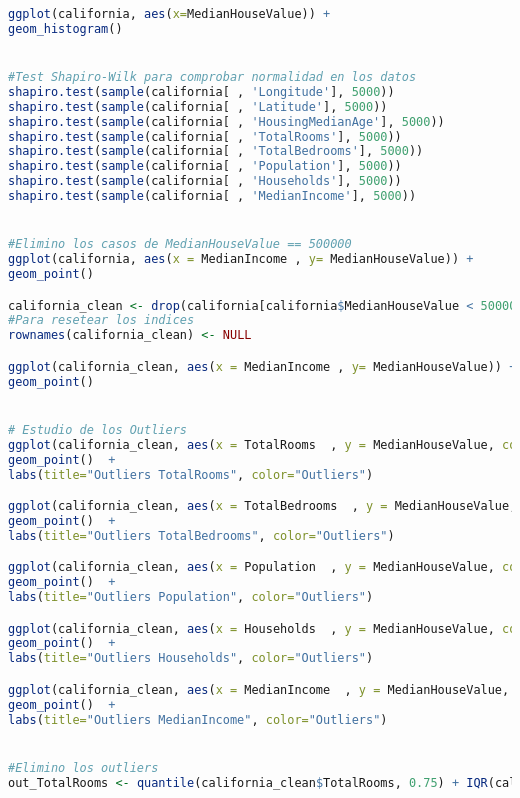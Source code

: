 \begin{lstlisting}[language=R]
ggplot(california, aes(x=MedianHouseValue)) +
geom_histogram()


#Test Shapiro-Wilk para comprobar normalidad en los datos
shapiro.test(sample(california[ , 'Longitude'], 5000))
shapiro.test(sample(california[ , 'Latitude'], 5000))
shapiro.test(sample(california[ , 'HousingMedianAge'], 5000))
shapiro.test(sample(california[ , 'TotalRooms'], 5000))
shapiro.test(sample(california[ , 'TotalBedrooms'], 5000))
shapiro.test(sample(california[ , 'Population'], 5000))
shapiro.test(sample(california[ , 'Households'], 5000))
shapiro.test(sample(california[ , 'MedianIncome'], 5000))


#Elimino los casos de MedianHouseValue == 500000
ggplot(california, aes(x = MedianIncome , y= MedianHouseValue)) +
geom_point()

california_clean <- drop(california[california$MedianHouseValue < 500000, ])
#Para resetear los indices
rownames(california_clean) <- NULL

ggplot(california_clean, aes(x = MedianIncome , y= MedianHouseValue)) +
geom_point()


# Estudio de los Outliers
ggplot(california_clean, aes(x = TotalRooms  , y = MedianHouseValue, color = TotalRooms > (quantile(TotalRooms, 0.75) + IQR(TotalRooms)*1.5) )) +
geom_point()  +
labs(title="Outliers TotalRooms", color="Outliers")

ggplot(california_clean, aes(x = TotalBedrooms  , y = MedianHouseValue, color = TotalBedrooms > (quantile(TotalBedrooms, 0.75) + IQR(TotalBedrooms)*1.5) )) +
geom_point()  +
labs(title="Outliers TotalBedrooms", color="Outliers")

ggplot(california_clean, aes(x = Population  , y = MedianHouseValue, color = Population > (quantile(Population, 0.75) + IQR(Population)*1.5) )) +
geom_point()  +
labs(title="Outliers Population", color="Outliers")

ggplot(california_clean, aes(x = Households  , y = MedianHouseValue, color = Households > (quantile(Households, 0.75) + IQR(Households)*1.5) )) +
geom_point()  +
labs(title="Outliers Households", color="Outliers")

ggplot(california_clean, aes(x = MedianIncome  , y = MedianHouseValue, color = MedianIncome > (quantile(MedianIncome, 0.75) + IQR(MedianIncome)*1.5) )) +
geom_point()  +
labs(title="Outliers MedianIncome", color="Outliers")


#Elimino los outliers
out_TotalRooms <- quantile(california_clean$TotalRooms, 0.75) + IQR(california_clean$TotalRooms)*1.5


\end{lstlisting}
